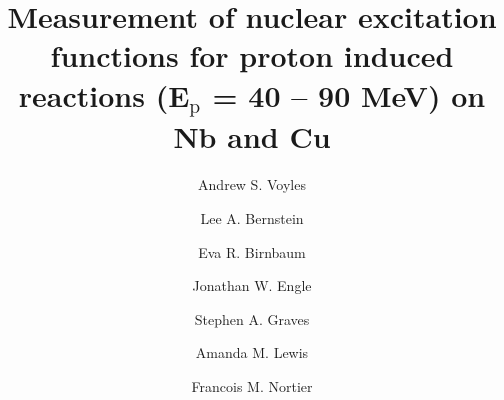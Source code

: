 \documentclass[3p]{elsarticle}
\begin{document}
\begin{frontmatter}


\title{Measurement of nuclear excitation functions for proton induced reactions (E$_{\text{p}}$ = 40 -- 90 MeV) on Nb and Cu}




\author[ucb]{Andrew S. Voyles }

% 
% 
% 


\author[ucb,lbl]{Lee A. Bernstein}


\author[lanl]{Eva R. Birnbaum}

\author[uwm]{Jonathan W. Engle}

\author[iowa]{Stephen A. Graves}

\author[ucb]{Amanda M. Lewis}


\author[lanl]{Francois M. Nortier}

% 







\end{frontmatter}
\end{document}
